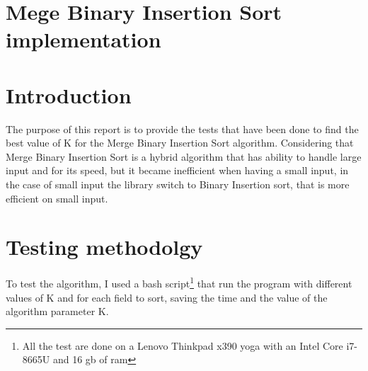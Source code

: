 \section{Mege Binary Insertion Sort implementation}
\section{Introduction}
The purpose of this report is to provide the tests that have been done to find the best value of K for the Merge Binary Insertion Sort algorithm.
Considering that Merge Binary Insertion Sort is a hybrid algorithm that has ability to handle large input and for its speed, but it became inefficient when having a small input, in the case of small input the library switch to Binary Insertion sort, that is more efficient on small input.

\section{Testing methodolgy}
To test the algorithm, I used a bash script\footnote{All the test are done on a Lenovo Thinkpad x390 yoga with an Intel Core i7-8665U and 16 gb of ram} that run the program with different values of K and for each field to sort, saving the time and the value of the algorithm parameter K.

